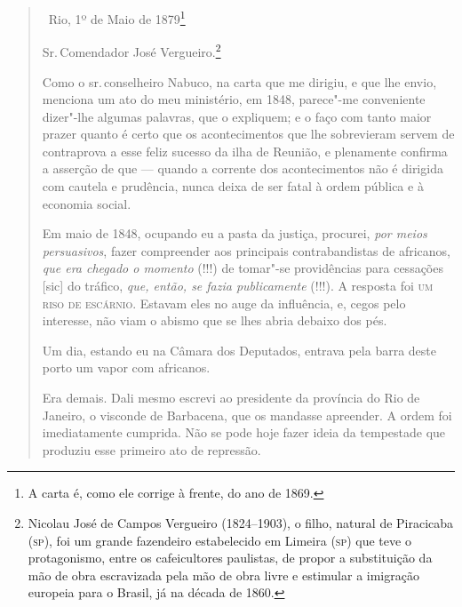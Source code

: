 \begin{quote}
\hfill\ Rio, 1º de Maio de 1879\footnote{A carta é, como ele corrige à
  frente, do ano de 1869.}\bigskip

\noindent{}Sr.\,Comendador José Vergueiro.\footnote{Nicolau José de Campos
  Vergueiro (1824--1903), o filho, natural de Piracicaba (\textsc{sp}), foi um
  grande fazendeiro estabelecido em Limeira (\textsc{sp}) que teve o
  protagonismo, entre os cafeicultores paulistas, de propor a
  substituição da mão de obra escravizada pela mão de obra livre e
  estimular a imigração europeia para o Brasil, já na década de 1860.}\smallskip

Como o sr.\,conselheiro Nabuco, na carta que me dirigiu, e que lhe envio,
menciona um ato do meu ministério, em 1848, parece"-me conveniente
dizer"-lhe algumas palavras, que o expliquem; e o faço com tanto maior
prazer quanto é certo que os acontecimentos que lhe sobrevieram servem
de contraprova a esse feliz sucesso da ilha de Reunião, e plenamente
confirma a asserção de que --- quando a corrente dos acontecimentos não
é dirigida com cautela e prudência, nunca deixa de ser fatal à ordem
pública e à economia social.

Em maio de 1848, ocupando eu a pasta da justiça, procurei, \emph{por
meios persuasivos}, fazer compreender aos principais contrabandistas de
africanos, \emph{que era chegado o momento} (!!!) de tomar"-se
providências para cessações {[}sic{]} do tráfico, \emph{que, então, se
fazia publicamente} (!!!). A resposta foi \textsc{um riso de escárnio}. Estavam
eles no auge da influência, e, cegos pelo interesse, não viam o abismo
que se lhes abria debaixo dos pés.

Um dia, estando eu na Câmara dos Deputados, entrava pela barra deste
porto um vapor com africanos.

Era demais. Dali mesmo escrevi ao presidente da província do Rio de
Janeiro, o visconde de Barbacena, que os mandasse apreender. A ordem foi
imediatamente cumprida. Não se pode hoje fazer ideia da tempestade que
produziu esse primeiro ato de repressão.


\end{quote}
